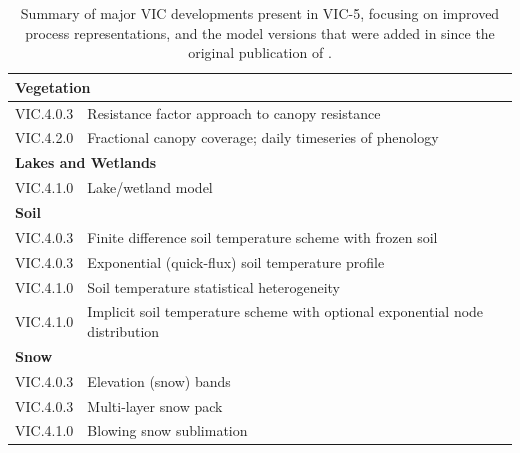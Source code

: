 \documentclass[gmd, manuscript]{copernicus}
\begin{document}
\clearpage
\begin{table}[]
  \centering
  \caption{Summary of major VIC developments present in VIC-5, focusing on improved process representations, and the model versions that were added in since the original publication of \citet{Liang_1994}.}
  \label{table:vic_development}
  \begin{tabular}{|l|l|}
    \hline
    \multicolumn{2}{|l|}{\textbf{Vegetation}}                                                                     \\ \hline
    VIC.4.0.3 & Resistance factor approach to canopy resistance \citep{Wigmosta_1994}                             \\ \hline
    VIC.4.2.0 & Fractional canopy coverage; daily timeseries of phenology \citep{Bohn_2016}                       \\ \hline
    \multicolumn{2}{|l|}{\textbf{Lakes and Wetlands}}                                                             \\ \hline
    VIC.4.1.0 & Lake/wetland model \citep{Cherkauer_2003,Bowling_2010}                                            \\ \hline
    \multicolumn{2}{|l|}{\textbf{Soil}}                                                                           \\ \hline
    VIC.4.0.3 & Finite difference soil temperature scheme with frozen soil \citep{Cherkauer_1999}                 \\ \hline
    VIC.4.0.3 & Exponential (quick-flux) soil temperature profile \citep{Liang_1999}                              \\ \hline
    VIC.4.1.0 & Soil temperature statistical heterogeneity \citep{Cherkauer_2003}                                 \\ \hline
    VIC.4.1.0 & Implicit soil temperature scheme with optional exponential node distribution \citep{Adam_2008}    \\ \hline
    \multicolumn{2}{|l|}{\textbf{Snow}}                                                                           \\ \hline
    VIC.4.0.3 & Elevation (snow) bands \citep{Nijssen_1997}                                                       \\ \hline
    VIC.4.0.3 & Multi-layer snow pack \citep{Cherkauer_1999,Andreadis_2009}                                       \\ \hline
    VIC.4.1.0 & Blowing snow sublimation \citep{Bowling_2004}                                                     \\ \hline
  \end{tabular}
\end{table}
\end{document}
